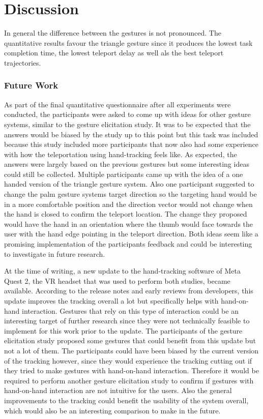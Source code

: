 \chapter{Discussion} %
\label{cha:Discussion}



In general the difference between the gestures is not pronounced. The quantitative results favour the triangle gesture since it produces the lowest task completion time, the lowest teleport delay as well als the best teleport trajectories.

\subsection{Future Work}

As part of the final quantitative questionnaire after all experiments were conducted, the participants were asked to come up with ideas for other gesture systems, similar to the gesture elicitation study. It was to be expected that the answers would be biased by the study up to this point but this task was included because this study included more participants that now also had some experience with how the teleportation using hand-tracking feels like. As expected, the answers were largely based on the previous gestures but some interesting ideas could still be collected. Multiple participants came up with the idea of a one handed version of the triangle gesture system. Also one participant suggested to change the palm gesture systems target direction so the targeting hand would be in a more comfortable position and the direction vector would not change when the hand is closed to confirm the teleport location. The change they proposed would have the hand in an orientation where the thumb would face towards the user with the hand edge pointing in the teleport direction. Both ideas seem like a promising implementation of the participants feedback and could be interesting to investigate in future research.

At the time of writing, a new update to the hand-tracking software of Meta Quest 2, the VR headset that was used to perform both studies, became available. According to the release notes and early reviews from developers, %
this update improves the tracking overall a lot but specifically helps with hand-on-hand interaction. Gestures that rely on this type of interaction could be an interesting target of further research since they were not technically feasible to implement for this work prior to the update. The participants of the gesture elicitation study proposed some gestures that could benefit from this update but not a lot of them. The participants could have been biased  by the current version of the tracking however, since they would experience the tracking cutting out if they tried to make gestures with hand-on-hand interaction. Therefore it would be required to perform another gesture elicitation study to confirm if gestures with hand-on-hand interaction are not intuitive for the users. Also the general improvements to the tracking could benefit the usability of the system overall, which would also be an interesting comparison to make in the future. 



